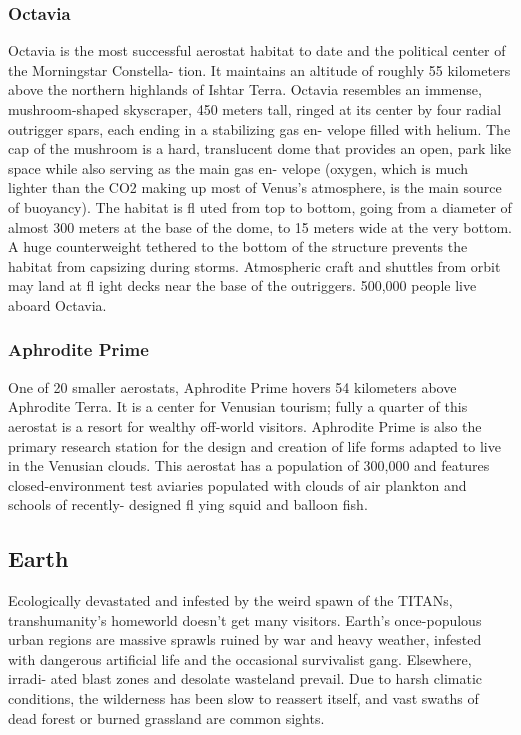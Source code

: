 \subsubsection{Octavia}

Octavia is the most successful aerostat habitat to date 
and the political center of the Morningstar Constella-
tion. It maintains an altitude of roughly 55 kilometers 
above the northern highlands of Ishtar Terra. Octavia 
resembles an immense, mushroom-shaped skyscraper, 
450 meters tall, ringed at its center by four radial 
outrigger spars, each ending in a stabilizing gas en-
velope filled with helium. The cap of the mushroom 
is a hard, translucent dome that provides an open, 
park like space while also serving as the main gas en-
velope (oxygen, which is much lighter than the CO2 
making up most of Venus's atmosphere, is the main 
source of buoyancy). The habitat is fl uted from top to 
bottom, going from a diameter of almost 300 meters 
at the base of the dome, to 15 meters wide at the very 
bottom. A huge counterweight tethered to the bottom 
of the structure prevents the habitat from capsizing 
during storms. Atmospheric craft and shuttles from 
orbit may land at fl ight decks near the base of the 
outriggers. 500,000 people live aboard Octavia. 

\subsubsection{Aphrodite Prime}

One of 20 smaller aerostats, Aphrodite Prime hovers 
54 kilometers above Aphrodite Terra. It is a center for 
Venusian tourism; fully a quarter of this aerostat is a 
resort for wealthy off-world visitors. Aphrodite Prime 
is also the primary research station for the design and 
creation of life forms adapted to live in the Venusian 
clouds. This aerostat has  a population of 300,000 and 
features closed-environment test aviaries populated 
with clouds of air plankton and schools of recently-
designed fl ying squid and balloon fish.

\subsection{Earth}

Ecologically devastated and infested by the weird 
spawn of the TITANs, transhumanity's homeworld 
doesn't get many visitors. Earth's once-populous 
urban regions are massive sprawls ruined by war and 
heavy weather, infested with dangerous artificial life 
and the occasional survivalist gang. Elsewhere, irradi-
ated blast zones and desolate wasteland prevail. Due 
to harsh climatic conditions, the wilderness has been 
slow to reassert itself, and vast swaths of dead forest 
or burned grassland are common sights.


